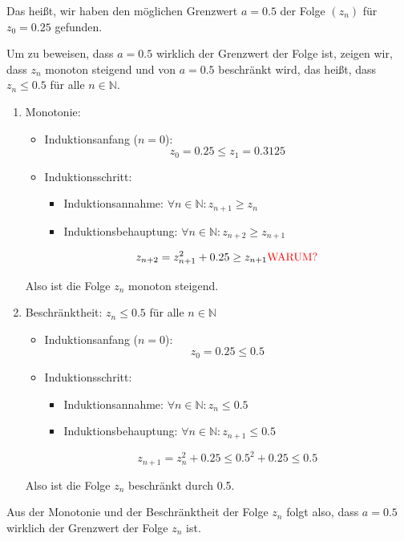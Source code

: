 \documentclass[a4paper, 12pt]{book}
\begin{document}
Das heißt, wir haben den möglichen Grenzwert \(a = 0.5\) der Folge
\(\left( z_{n} \right)\) für \(z_{0} = 0.25\) gefunden.

Um zu beweisen, dass \(a = 0.5\) wirklich der Grenzwert der Folge
ist, zeigen wir, dass \(z_{n}\) monoton steigend und von \(a = 0.5\)
beschränkt wird, das heißt, dass \(z_{n} \leq 0.5\) für alle
\(n\mathbb{ \in N}\).

\begin{enumerate}
\item
  Monotonie:

\begin{itemize}
\item Induktionsanfang (\(n = 0\)):
\[z_{0} = 0.25 \leq z_{1} = 0.3125\]
\item Induktionsschritt:
\begin{itemize}
\item Induktionsannahme: \(\forall n \in \mathbb{N}:z_{n + 1} \geq z_{n}\)
\item Induktionsbehauptung:
\(\forall n \in \mathbb{N}:z_{n + 2} \geq z_{n + 1}\)
\end{itemize}
\[z_{n + 2} = z_{n + 1}^{2} + 0.25 \geq z_{n + 1}\text{\textcolor{red}{WARUM?}}\]
\end{itemize}
Also ist die Folge \(z_{n}\) monoton steigend.

\item
  Beschränktheit: \(z_{n} \leq 0.5\) für alle \(n\mathbb{ \in N}\)
\begin{itemize}
\item Induktionsanfang (\(n = 0\)):
\[z_{0} = 0.25 \leq 0.5\]
\item Induktionsschritt:
\begin{itemize}
\item Induktionsannahme: \(\forall n \in \mathbb{N}:z_{n} \leq 0.5\)
\item Induktionsbehauptung:
\(\forall n \in \mathbb{N}:z_{n + 1} \leq 0.5\)
\end{itemize}
\[z_{n + 1} = z_{n}^{2} + 0.25 \leq {0.5}^{2} + 0.25 \leq 0.5\]
\end{itemize}
Also ist die Folge \(z_{n}\) beschränkt durch 0.5.
\end{enumerate}

Aus der Monotonie und der Beschränktheit der Folge \(z_{n}\) folgt also,
dass \(a = 0.5\) wirklich der Grenzwert der Folge \(z_{n}\) ist.
\hfill\blacksquare

\end{document}

